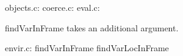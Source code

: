 \documentclass{article}
\begin{document}
objects.c:
coerce.c:
eval.c:

findVarInFrame takes an additional argument.


envir.c:
 findVarInFrame
 findVarLocInFrame
\end{document}
